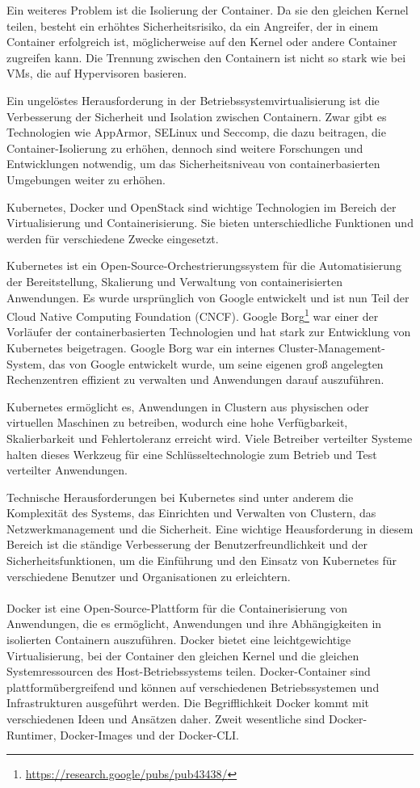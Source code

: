 Ein weiteres Problem ist die Isolierung der Container. Da sie den gleichen Kernel teilen, besteht ein erhöhtes Sicherheitsrisiko, da ein Angreifer, der in einem Container erfolgreich ist, möglicherweise auf den Kernel oder andere Container zugreifen kann. Die Trennung zwischen den Containern ist nicht so stark wie bei VMs, die auf Hypervisoren basieren.

Ein ungelöstes Herausforderung in der Betriebssystemvirtualisierung ist die Verbesserung der Sicherheit und Isolation zwischen Containern. Zwar gibt es Technologien wie AppArmor, SELinux und Seccomp, die dazu beitragen, die Container-Isolierung zu erhöhen, dennoch sind weitere Forschungen und Entwicklungen notwendig, um das Sicherheitsniveau von containerbasierten Umgebungen weiter zu erhöhen.

Kubernetes, Docker und OpenStack sind wichtige Technologien im Bereich der Virtualisierung und Containerisierung. Sie bieten unterschiedliche Funktionen und werden für verschiedene Zwecke eingesetzt.

Kubernetes ist ein Open-Source-Orchestrierungssystem für die Automatisierung der Bereitstellung, Skalierung und Verwaltung von containerisierten Anwendungen. Es wurde ursprünglich von Google entwickelt und ist nun Teil der Cloud Native Computing Foundation (CNCF). Google Borg\footnote{\url{https://research.google/pubs/pub43438/}} war einer der Vorläufer der containerbasierten Technologien und hat stark zur Entwicklung von Kubernetes beigetragen.  Google Borg war ein internes Cluster-Management-System, das von Google entwickelt wurde, um seine eigenen groß angelegten Rechenzentren effizient zu verwalten und Anwendungen darauf auszuführen. 

Kubernetes ermöglicht es, Anwendungen in Clustern aus physischen oder virtuellen Maschinen zu betreiben, wodurch eine hohe Verfügbarkeit, Skalierbarkeit und Fehlertoleranz erreicht wird. Viele Betreiber verteilter Systeme halten dieses Werkzeug für eine Schlüsseltechnologie zum Betrieb und Test verteilter Anwendungen.

Technische Herausforderungen bei Kubernetes sind unter anderem die Komplexität des Systems, das Einrichten und Verwalten von Clustern, das Netzwerkmanagement und die Sicherheit. Eine wichtige Heausforderung in diesem Bereich ist die ständige Verbesserung der Benutzerfreundlichkeit und der Sicherheitsfunktionen, um die Einführung und den Einsatz von Kubernetes für verschiedene Benutzer und Organisationen zu erleichtern.
\\\\
Docker ist eine Open-Source-Plattform für die Containerisierung von Anwendungen, die es ermöglicht, Anwendungen und ihre Abhängigkeiten in isolierten Containern auszuführen. Docker bietet eine leichtgewichtige Virtualisierung, bei der Container den gleichen Kernel und die gleichen Systemressourcen des Host-Betriebssystems teilen. Docker-Container sind plattformübergreifend und können auf verschiedenen Betriebssystemen und Infrastrukturen ausgeführt werden. Die Begrifflichkeit Docker kommt mit verschiedenen Ideen und Ansätzen daher. Zweit wesentliche sind Docker-Runtimer, Docker-Images und der Docker-CLI.


